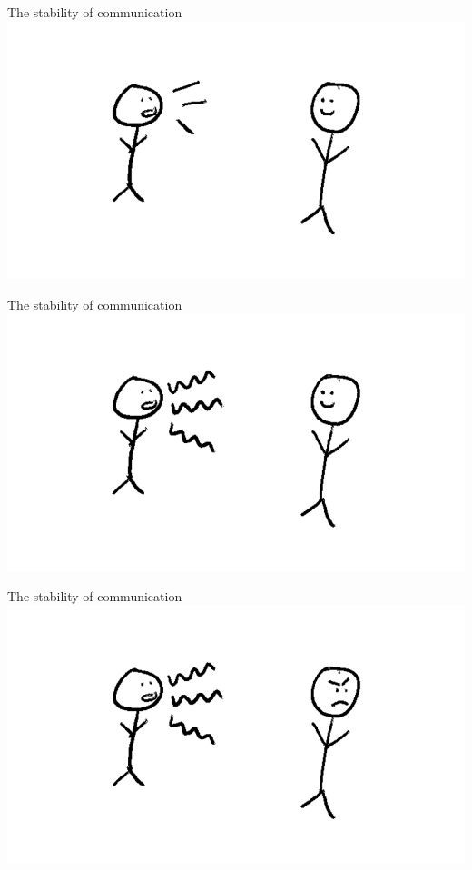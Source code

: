\documentclass[xcolor=table]{beamer}       %
\begin{document}
\begin{frame}{The stability of communication}
    \includegraphics[width=\textwidth]{img/stability-communication-1.png}

    \vfill

    \hfill \footnotesize{\citep{Scott-Phillips08}}
\end{frame}
\begin{frame}{The stability of communication}
    \includegraphics[width=\textwidth]{img/stability-communication-2.png}

    \vfill

    \hfill \footnotesize{\citep{Scott-Phillips08}}
\end{frame}
\begin{frame}{The stability of communication}
    \includegraphics[width=\textwidth]{img/stability-communication-3.png}

    \vfill

    \hfill \footnotesize{\citep{Scott-Phillips08}}
\end{frame}
\end{document}
